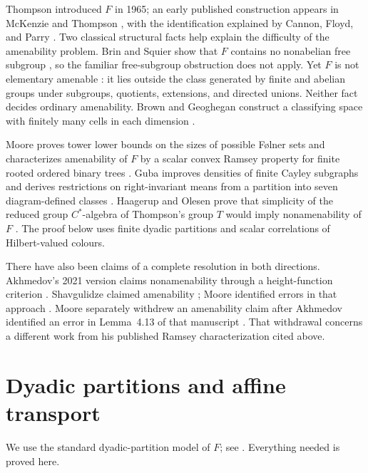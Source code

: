 \documentclass[11pt]{article}
\theoremstyle{definition}
\numberwithin{equation}{section}
\begin{document}
Thompson introduced \(F\) in 1965; an early published construction appears
in McKenzie and Thompson \cite{McKenzieThompson1973}, with the identification
explained by Cannon, Floyd, and Parry \cite[pp.~215--216]{CannonFloydParry1996}.
Two classical structural facts help explain the difficulty of the
amenability problem. Brin and Squier show that \(F\) contains no
nonabelian free subgroup \cite[Theorem~3.1]{BrinSquier1985}, so the familiar
free-subgroup obstruction does not apply. Yet \(F\) is not elementary
amenable \cite[Theorem~4.10]{CannonFloydParry1996}: it lies outside the class
generated by finite and abelian groups under subgroups, quotients,
extensions, and directed unions. Neither fact decides ordinary
amenability. Brown and Geoghegan construct a classifying space with finitely
many cells in each dimension \cite{BrownGeoghegan1984}.

Moore proves tower lower bounds on the sizes of possible
F\o lner sets \cite[Theorem~1.1]{MooreFolner2013} and characterizes
amenability of \(F\) by a scalar convex Ramsey property for finite rooted
ordered binary trees \cite[Theorem~3.1]{Moore2013}. Guba improves densities
of finite Cayley subgraphs \cite{Guba2025Density} and derives restrictions
on right-invariant means from a partition into seven diagram-defined
classes \cite{Guba2026}. Haagerup and Olesen prove that simplicity of the
reduced group \(C^*\)-algebra of Thompson's group \(T\) would imply
nonamenability of \(F\) \cite[Theorem~5.5]{HaagerupOlesen2017}.
The proof below uses finite dyadic partitions and scalar correlations of
Hilbert-valued colours.

There have also been claims of a complete resolution in both directions.
Akhmedov's 2021 version claims nonamenability through a height-function
criterion \cite{Akhmedov2021}. Shavgulidze claimed amenability
\cite{Shavgulidze2009}; Moore identified errors in that approach
\cite{Moore2011Critique}. Moore separately withdrew an amenability claim
after Akhmedov identified an error in Lemma~4.13 of that manuscript
\cite{Moore2012Withdrawn}. That withdrawal concerns a different work from
his published Ramsey characterization cited above.

\section{Dyadic partitions and affine transport}\label{sec:dyadic}

We use the standard dyadic-partition model of \(F\); see
\cite[Section~2, Lemma~2.2]{CannonFloydParry1996}. Everything needed is
proved here.
\end{document}
